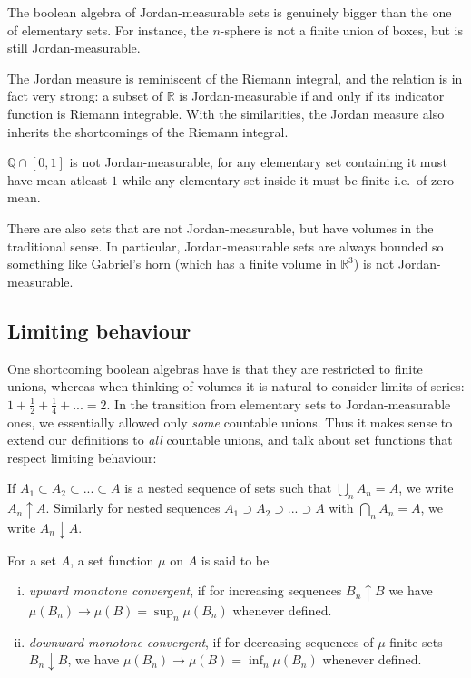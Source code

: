 \documentclass[9pt]{report}
\newlength{\tindent}
\newtheorem[L]{theorem}{Theorem}[chapter]
\newtheorem[L,nocut]{definition}[theorem]{Definition}
\newtheorem[S,nounderline]{remark}[theorem]{Remarks}
\newenvironment{Example}{ 
	\setlength{\parindent}{\tindent}
\begin{example}}
{\end{example} \setlength{\parindent}{0pt}}
\begin{document}
\begin{remark}
	The boolean algebra of Jordan-measurable sets is genuinely bigger than the one of elementary sets. For instance, the \(n\)-sphere is not a finite union of boxes, but is still Jordan-measurable. 
\end{remark}

The Jordan measure is reminiscent of the Riemann integral, and the relation is in fact very strong: a subset of \(\mathbb{R}\) is Jordan-measurable if and only if its indicator function is Riemann integrable. With the similarities, the Jordan measure also inherits the shortcomings of the Riemann integral.

\begin{Example}
\(\mathbb{Q}\cap [0,1]\) is not Jordan-measurable, for any elementary set containing it must have mean atleast \(1\) while any elementary set inside it must be finite i.e.\ of zero mean.
\end{Example}

There are also sets that are not Jordan-measurable, but have volumes in the traditional sense. In particular, Jordan-measurable sets are always bounded so something like Gabriel's horn (which has a finite volume in \(\mathbb{R}^3\)) is not Jordan-measurable.

\subsection{Limiting behaviour}

One shortcoming boolean algebras have is that they are restricted to finite unions, whereas when thinking of volumes it is natural to consider limits of series: \(1 + \frac{1}{2} + \frac{1}{4} + ... = 2\). In the transition from elementary sets to Jordan-measurable ones, we essentially allowed only \emph{some} countable unions. Thus it makes sense to extend our definitions to \emph{all} countable unions, and talk about set functions that respect limiting behaviour:

If \(A_1\subset A_2 \subset ... \subset A\) is a nested sequence of sets such that \(\bigcup_n A_n = A\), we write \(A_n \uparrow A\). Similarly for nested sequences \(A_1\supset A_2 \supset ... \supset A\) with \(\bigcap_nA_n=A\), we write \(A_n \downarrow A\).

\begin{definition}
	For a set \(A\), a set function \(\mu\) on \(A\) is said to be 
	\begin{enumerate}[(i)]
		\item \emph{upward monotone convergent}, if for increasing sequences \(B_n \uparrow B\) we have \(\mu(B_n)\rightarrow \mu(B)=\sup_n\mu(B_n)\) whenever defined.
		\item \emph{downward monotone convergent}, if for decreasing sequences of \(\mu\)-finite sets \(B_n\downarrow B\), we have \(\mu(B_n)\rightarrow \mu(B)=\inf_n \mu(B_n)\) whenever defined.
	\end{enumerate}
\end{definition}
\end{document}
